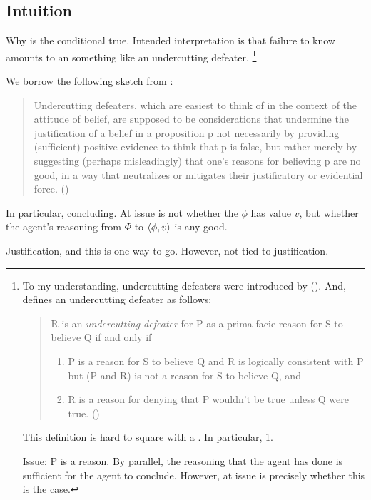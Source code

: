 \subsection{Intuition}
\label{sec:intuition-1}

\begin{note}
  Why is the conditional true.
  Intended interpretation is that failure to know \fc{} amounts to an something like an undercutting defeater.%
  \footnote{
    To my understanding, undercutting defeaters were introduced by \citeauthor{Pollock:1987un} (\citeyear{Pollock:1987un}).
    And, \citeauthor{Pollock:1987un} defines an undercutting defeater as follows:
    \begin{quote}
    R is an \emph{undercutting defeater} for P as a prima facie reason for S to believe Q if and only if
    \begin{enumerate}[label=(UD\arabic*), ref=(UD\arabic*)]
    \item
      \label{pollock:ud:1}
      P is a reason for S to believe Q and R is logically consistent with P but (P and R) is not a reason for S to believe Q, and
    \item
      \label{pollock:ud:2}
      R is a reason for denying that P wouldn't be true unless Q were true.%
      \mbox{}\hfill\mbox{(\citeyear[485]{Pollock:1987un})}
    \end{enumerate}
  \end{quote}
  This definition is hard to square with a \requ{}.
  In particular, \ref{pollock:ud:1}.

  Issue: P is a reason.
  By parallel, the reasoning that the agent has done is sufficient for the agent to conclude.
  However, at issue is precisely whether this is the case.

  }

  We borrow the following sketch from \textcite{Worsnip:2018aa}:
  \begin{quote}
    Undercutting defeaters, which are easiest to think of in the context of the attitude of belief, are supposed to be considerations that undermine the justification of a belief in a proposition p not necessarily by providing (sufficient) positive evidence to think that p is false, but rather merely by suggesting (perhaps misleadingly) that one’s reasons for believing p are no good, in a way that neutralizes or mitigates their justificatory or evidential force.%
    \mbox{}\hfill\mbox{(\citeyear[29]{Worsnip:2018aa})}
  \end{quote}

  In particular, concluding.
  At issue is not whether the \(\phi\) has value \(v\), but whether the agent's reasoning from \(\Phi\) to \(\langle \phi, v \rangle\) is any good.

  Justification, and this is one way to go.
  However, not tied to justification.
\end{note}

